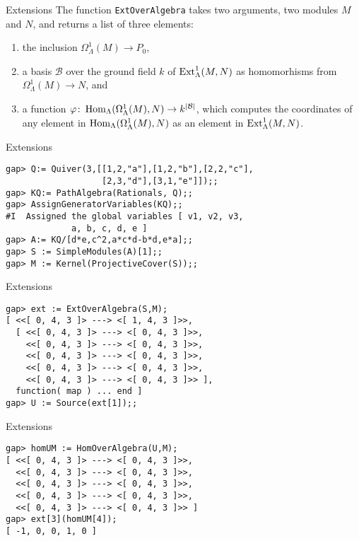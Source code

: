 \begin{frame}{Extensions}
The function \texttt{ExtOverAlgebra} takes two arguments, two modules
$M$ and $N$, and returns a list of three elements: 
\begin{enumerate}[\rm(1)]
\item the inclusion $\Omega^1_\Lambda(M)\to P_0$, 
\item a basis $\mathcal{B}$ over the ground field $k$ of
  $\operatorname{Ext}\nolimits^1_\Lambda(M,N)$ as homomorhisms from $\Omega^1_\Lambda(M)\to
  N$, and 
\item a function $\varphi\colon \operatorname{Hom}_\Lambda(\Omega^1_\Lambda(M),N)
  \to k^{|\mathcal{B}|}$, which computes the coordinates of any
  element in $\operatorname{Hom}_\Lambda(\Omega^1_\Lambda(M),N)$  as an element in 
$\operatorname{Ext}\nolimits^1_\Lambda(M,N)$. 
\end{enumerate}
\end{frame}

\begin{frame}[fragile]{Extensions}
\begin{verbatim}
gap> Q:= Quiver(3,[[1,2,"a"],[1,2,"b"],[2,2,"c"],
                   [2,3,"d"],[3,1,"e"]]);;
gap> KQ:= PathAlgebra(Rationals, Q);;
gap> AssignGeneratorVariables(KQ);;
#I  Assigned the global variables [ v1, v2, v3, 
             a, b, c, d, e ]
gap> A:= KQ/[d*e,c^2,a*c*d-b*d,e*a];;
gap> S := SimpleModules(A)[1];;
gap> M := Kernel(ProjectiveCover(S));;
\end{verbatim}
\end{frame}

\begin{frame}[fragile]{Extensions}
\begin{verbatim}
gap> ext := ExtOverAlgebra(S,M);
[ <<[ 0, 4, 3 ]> ---> <[ 1, 4, 3 ]>>, 
  [ <<[ 0, 4, 3 ]> ---> <[ 0, 4, 3 ]>>,
    <<[ 0, 4, 3 ]> ---> <[ 0, 4, 3 ]>>, 
    <<[ 0, 4, 3 ]> ---> <[ 0, 4, 3 ]>>,
    <<[ 0, 4, 3 ]> ---> <[ 0, 4, 3 ]>>, 
    <<[ 0, 4, 3 ]> ---> <[ 0, 4, 3 ]>> ],
  function( map ) ... end ]
gap> U := Source(ext[1]);;
\end{verbatim}
\end{frame}

\begin{frame}[fragile]{Extensions}
\begin{verbatim}
gap> homUM := HomOverAlgebra(U,M);
[ <<[ 0, 4, 3 ]> ---> <[ 0, 4, 3 ]>>,
  <<[ 0, 4, 3 ]> ---> <[ 0, 4, 3 ]>>, 
  <<[ 0, 4, 3 ]> ---> <[ 0, 4, 3 ]>>,
  <<[ 0, 4, 3 ]> ---> <[ 0, 4, 3 ]>>, 
  <<[ 0, 4, 3 ]> ---> <[ 0, 4, 3 ]>> ]
gap> ext[3](homUM[4]);
[ -1, 0, 0, 1, 0 ]
\end{verbatim}
\end{frame}

